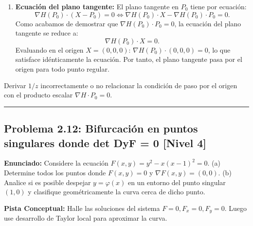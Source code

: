 \documentclass[11pt,a4paper]{article}
\begin{document}
\begin{enumerate}[label=\textbf{\arabic*.}]
\item \textbf{Ecuación del plano tangente:}
El plano tangente en $P_0$ tiene por ecuación:
\begin{equation*}
\nabla H(P_0) \cdot (X - P_0) = 0 \iff \nabla H(P_0) \cdot X - \nabla H(P_0) \cdot P_0 = 0.
\end{equation*}
Como acabamos de demostrar que $\nabla H(P_0) \cdot P_0 = 0$, la ecuación del plano tangente se reduce a:
\begin{equation*}
\nabla H(P_0) \cdot X = 0.
\end{equation*}
Evaluando en el origen $X = (0,0,0)$: $\nabla H(P_0) \cdot (0,0,0) = 0$, lo que satisface idénticamente la ecuación.
Por tanto, el plano tangente pasa por el origen para todo punto regular.
\end{enumerate}

\begin{trapbox}
Derivar $1/z$ incorrectamente o no relacionar la condición de paso por el origen con el producto escalar $\nabla H \cdot P_0 = 0$.
\end{trapbox}

\vspace{0.5cm}
\hrule
\vspace{0.5cm}

\subsection*{Problema 2.12: Bifurcación en puntos singulares donde det DyF = 0 \hfill \color{primaryblue}\small[Nivel 4]}

\begin{tcolorbox}[colback=white,colframe=gray!40,arc=1mm,boxrule=0.5pt,left=3mm,right=3mm,top=2mm,bottom=2mm]
\textbf{Enunciado:} Considere la ecuación $F(x,y) = y^2 - x(x - 1)^2 = 0$. (a) Determine todos los puntos donde $F(x,y) = 0$ y $\nabla F(x,y) = (0,0)$. (b) Analice si es posible despejar $y = \varphi(x)$ en un entorno del punto singular $(1,0)$ y clasifique geométricamente la curva cerca de dicho punto.
\end{tcolorbox}

\begin{tcolorbox}[colback=yellow!4,colframe=accentamber!70,arc=1mm,boxrule=0.5pt,left=3mm,right=3mm,top=1.5mm,bottom=1.5mm]
\textbf{Pista Conceptual:} Halle las soluciones del sistema $F=0, F_x=0, F_y=0$. Luego use desarrollo de Taylor local para aproximar la curva.
\end{tcolorbox}
\end{document}
